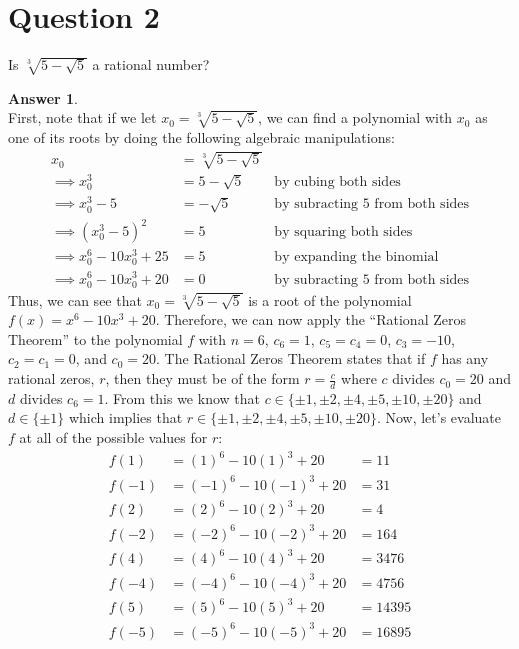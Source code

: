 \documentclass[10pt,a4paper]{article}
\theoremstyle{definition}
\newtheorem*{answer*}{Answer}
\begin{document}
\newpage

\section*{Question 2}
Is $\sqrt[3]{5 - \sqrt{5}}$ a rational number?

\begin{answer*}{$ $}
\\First, note that if we let $x_0 = \sqrt[3]{5 - \sqrt{5}}$, we can find a polynomial with $x_0$ as one of its roots by doing the following algebraic manipulations:
\begin{align*}
x_0 &= \sqrt[3]{5 - \sqrt{5}}\\
\implies x_0^3 &= 5 - \sqrt{5} &\text{by cubing both sides}\\
\implies x_0^3 - 5 &= -\sqrt{5} &\text{by subracting 5 from both sides}\\
\implies (x_0^3 - 5)^2 &= 5 &\text{by squaring both sides}\\
\implies x_0^6 - 10x_0^3 + 25 &= 5 &\text{by expanding the binomial}\\
\implies x_0^6 - 10x_0^3 + 20 &= 0 &\text{by subracting 5 from both sides}
\end{align*}
Thus, we can see that $x_0 = \sqrt[3]{5 - \sqrt{5}}$ is a root of the polynomial $f(x) = x^6 - 10x^3 + 20$. Therefore, we can now apply the \enquote{Rational Zeros Theorem} to the polynomial $f$ with $n = 6$, $c_6 = 1$, $c_5 = c_4 = 0$, $c_3 = -10$, $c_2 = c_1 = 0$, and $c_0 = 20$. The Rational Zeros Theorem states that if $f$ has any rational zeros, $r$, then they must be of the form $\displaystyle r = \frac{c}{d}$ where $c$ divides $c_0 = 20$ and $d$ divides $c_6 = 1$. From this we know that $c \in \{\pm 1, \pm 2, \pm 4, \pm 5, \pm 10, \pm 20\}$ and $d \in \{\pm 1\}$ which implies that $r \in \{\pm 1, \pm 2, \pm 4, \pm 5, \pm 10, \pm 20\}$. Now, let's evaluate $f$ at all of the possible values for $r$:
\begin{align*}
f(1) &= (1)^6 - 10(1)^3 + 20 &= 11\\
f(-1) &= (-1)^6 - 10(-1)^3 + 20 &= 31\\
f(2) &= (2)^6 - 10(2)^3 + 20 &= 4\\
f(-2) &= (-2)^6 - 10(-2)^3 + 20 &= 164\\
f(4) &= (4)^6 - 10(4)^3 + 20 &= 3476\\
f(-4) &= (-4)^6 - 10(-4)^3 + 20 &= 4756\\
f(5) &= (5)^6 - 10(5)^3 + 20 &= 14395\\
f(-5) &= (-5)^6 - 10(-5)^3 + 20 &= 16895\\

\end{align*}
\end{answer*}
\end{document}
